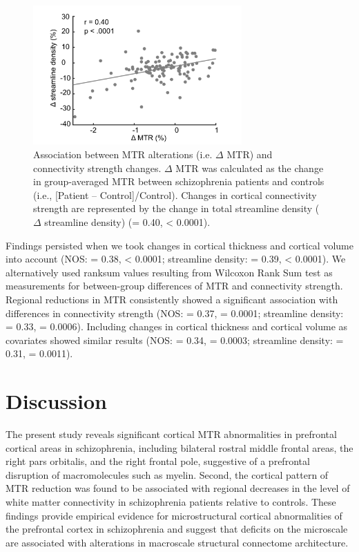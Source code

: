 \begin{refsection}
\begin{figure}[h]
    \centering
    \includegraphics[width=8cm]{images/mtrFig4.jpg}
    \caption{Association between MTR alterations (i.e. $\Delta$ MTR) and connectivity strength changes. $\Delta$ MTR was calculated as the change in group-averaged MTR between schizophrenia patients and controls (i.e., {[}Patient – Control{]}/Control). Changes in cortical connectivity strength are represented by the change in total streamline density ($\Delta$ streamline density) (\rval = 0.40, \pval < 0.0001).}
    \label{mtrFig4}
\end{figure}

Findings persisted when we took changes in cortical thickness and cortical volume into account (NOS: \rval = 0.38, \pval < 0.0001; streamline density: \rval = 0.39, \pval < 0.0001). We alternatively used ranksum values resulting from Wilcoxon Rank Sum test as measurements for between-group differences of MTR and connectivity strength. Regional reductions in MTR consistently showed a significant association with differences in connectivity strength (NOS: \rval = 0.37, \pval = 0.0001; streamline density: \rval = 0.33, \pval = 0.0006). Including changes in cortical thickness and cortical volume as covariates showed similar results (NOS: \rval = 0.34, \pval = 0.0003; streamline density: \rval = 0.31, \pval = 0.0011).


\section*{Discussion}
The present study reveals significant cortical MTR abnormalities in prefrontal cortical areas in schizophrenia, including bilateral rostral middle frontal areas, the right pars orbitalis, and the right frontal pole, suggestive of a prefrontal disruption of macromolecules such as myelin. Second, the cortical pattern of MTR reduction was found to be associated with regional decreases in the level of white matter connectivity in schizophrenia patients relative to controls. These findings provide empirical evidence for microstructural cortical abnormalities of the prefrontal cortex in schizophrenia and suggest that deficits on the microscale are associated with alterations in macroscale structural connectome architecture.\\


\end{refsection}

